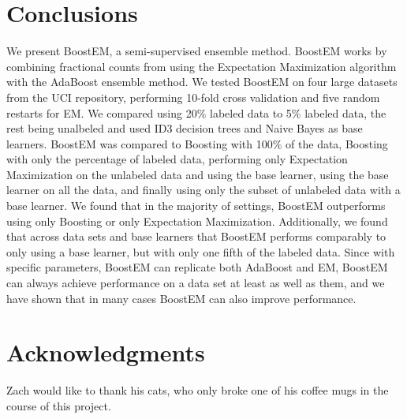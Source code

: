 \documentclass{sig-alternate}
\begin{document}
\section{Conclusions}
We present BoostEM, a semi-supervised ensemble method.  BoostEM works by combining fractional counts from using the Expectation Maximization algorithm with the AdaBoost ensemble method.  We tested BoostEM on four large datasets from the UCI repository, performing 10-fold cross validation and five random restarts for EM.  We compared using 20\% labeled data to 5\% labeled data, the rest being unalbeled and used ID3 decision trees and Naive Bayes as base learners.  BoostEM was compared to Boosting with 100\% of the data, Boosting with only the percentage of labeled data, performing only Expectation Maximization on the unlabeled data and using the base learner, using the base learner on all the data, and finally using only the subset of unlabeled data with a base learner. We found that in the majority of settings, BoostEM outperforms using only Boosting or only Expectation Maximization.  Additionally, we found that across data sets and base learners that BoostEM performs comparably to only using a base learner, but with only one fifth of the labeled data. Since with specific parameters, BoostEM can replicate both AdaBoost and EM, BoostEM can always achieve performance on a data set at least as well as them, and we have shown that in many cases BoostEM can also improve performance.

\section{Acknowledgments}
Zach would like to thank his cats, who only broke one of his coffee mugs in the course of this project.


\end{document}
